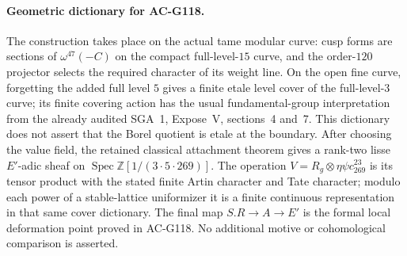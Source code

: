 \paragraph{Geometric dictionary for AC-G118.}
The construction takes place on the actual tame modular curve: cusp forms
are sections of $\omega^{47}(-C)$ on the compact full-level-$15$ curve,
and the order-$120$ projector selects the required character of its weight
line.  On the open fine curve, forgetting the added full level $5$ gives
a finite etale level cover of the full-level-$3$ curve; its finite covering
action has the usual fundamental-group interpretation from the already
audited SGA~1, Expose~V, sections~4 and~7.  This dictionary does not assert
that the Borel quotient is etale at the boundary.
After choosing the value field, the retained classical attachment theorem
gives a rank-two lisse $E'$-adic sheaf on
$\operatorname{Spec}\mathbb Z[1/(3\cdot5\cdot269)]$.
The operation $V=R_g\otimes\eta\psi c_{269}^{23}$ is its tensor product
with the stated finite Artin character and Tate character; modulo each
power of a stable-lattice uniformizer it is a finite continuous
representation in that same cover dictionary.
The final map $S.R\to A\to E'$ is the formal local deformation point proved
in AC-G118.  No additional motive or cohomological comparison is asserted.
